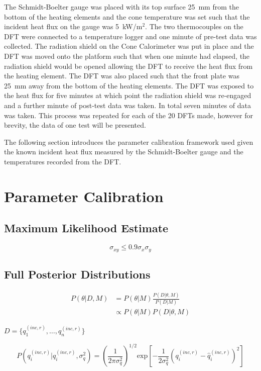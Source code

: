 \documentclass[article]{proc}
\begin{document}
    The Schmidt-Boelter gauge was placed with its top surface 25~mm from the bottom of the heating elements and the cone temperature was set such that the incident heat flux on the gauge was 5~kW/m$^2$. The two thermocouples on the DFT were connected to a temperature logger and one minute of pre-test data was collected. The radiation shield on the Cone Calorimeter was put in place and the DFT was moved onto the platform such that when one minute had elapsed, the radiation shield would be opened allowing the DFT to receive the heat flux from the heating element. The DFT was also placed such that the front plate was 25~mm away from the bottom of the heating elements. The DFT was exposed to the heat flux for five minutes at which point the radiation shield was re-engaged and a further minute of post-test data was taken. In total seven minutes of data was taken. This process was repeated for each of the 20 DFTs made, however for brevity, the data of one test will be presented. 

    The following section introduces the parameter calibration framework used given the known incident heat flux measured by the Schmidt-Boelter gauge and the temperatures recorded from the DFT. 

    \section{Parameter Calibration}

    \subsection{Maximum Likelihood Estimate}

    $$\sigma_{xy} \leq 0.9 \sigma_x \sigma_y$$

    \subsection{Full Posterior Distributions}

    \begin{align}\label{eq:bayes}
        P(\theta | D, M) &= P(\theta|M) \frac{P(D|\theta, M)}{P(D|M)}\\
            &\propto P(\theta|M) P(D|\theta, M)
    \end{align}

    \noindent $D = \{q^{(inc,r)}_1, \dots, q^{(inc,r)}_n \}$

    \begin{equation}\label{eq:likelihood}
        P(q_i^{(inc,r)}| \hat{q}_i^{(inc,r)}, \sigma_q^2) = \left(\frac{1}{2 \pi \sigma_q^2} \right)^{1/2} \text{exp} \left[-\frac{1}{2 \sigma_q^2} \left( q_i^{(inc,r)} - \hat{q}_i^{(inc,r)} \right)^2 \right]
    \end{equation}
\end{document}
